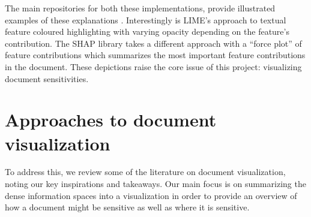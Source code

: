 \documentclass[\version]{l4proj}
\begin{document}
The main repositories for both these implementations, provide illustrated examples of these explanations \autocite{lundbergSlundbergShap2020,ribeiroMarcotcrLime2020}.
Interestingly is LIME's approach to textual feature coloured highlighting with varying opacity depending on the feature's contribution.
The SHAP library takes a different approach with a ``force plot'' of feature contributions which summarizes the most important feature contributions in the document.
These depictions raise the core issue of this project: visualizing document sensitivities.

\section{Approaches to document visualization}

To address this, we review some of the literature on document visualization, noting our key inspirations and takeaways.
Our main focus is on summarizing the dense information spaces into a visualization in order to provide an overview of how a document might be sensitive as well as where it is sensitive.
\end{document}
